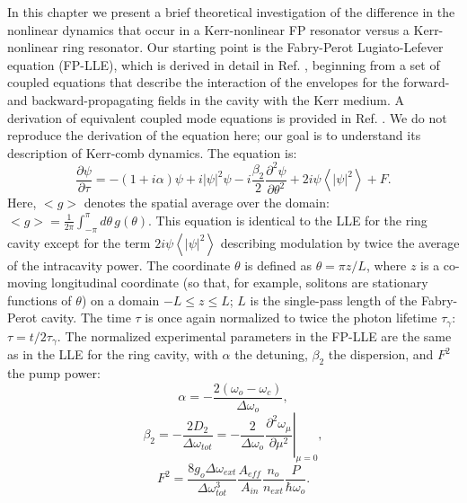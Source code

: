 In this chapter we present a brief theoretical investigation of the difference in the nonlinear dynamics that occur in a Kerr-nonlinear FP resonator versus a Kerr-nonlinear ring resonator. Our starting point is the Fabry-Perot Lugiato-Lefever equation (FP-LLE), which is derived in detail in Ref. , beginning from a set of coupled equations that describe the interaction of the envelopes for the forward- and backward-propagating fields in the cavity with the Kerr medium. A derivation of equivalent coupled mode equations is provided in Ref. . We do not reproduce the derivation of the equation here; our goal is to understand its description of Kerr-comb dynamics. The equation is:
\begin{equation}
\frac{\partial\psi}{\partial\tau}=-(1+i\alpha)\psi+i|\psi|^2\psi-i\frac{\beta_2}{2}\frac{\partial^2\psi}{\partial\theta^2}+2i\psi\left<|\psi|^2\right>+F\label{eq:FPLLE}.
\end{equation}
Here, $<g>$ denotes the spatial average over the domain: $<g>=\frac{1}{2\pi}\int_{-\pi}^{\pi}d\theta\,g(\theta)$. This equation is identical to the LLE for the ring cavity except for the term $2i\psi\left<|\psi|^2\right>$ describing modulation by twice the average of the intracavity power. The coordinate $\theta$ is defined as $\theta=\pi z/L$, where $z$ is a co-moving longitudinal coordinate (so that, for example, solitons are stationary functions of $\theta$) on a domain $-L\leq z\leq L$; $L$ is the single-pass length of the Fabry-Perot cavity. The time $\tau$ is once again normalized to twice the photon lifetime $\tau_\gamma$: $\tau=t/2\tau_\gamma$. The normalized experimental parameters in the FP-LLE are the same as in the LLE for the ring cavity, with $\alpha$ the detuning, $\beta_2$ the dispersion, and $F^2$ the pump power:
\begin{equation}
\alpha=-\frac{2(\omega_o-\omega_c)}{\Delta\omega_o},
\end{equation}
\begin{equation}
\beta_2=\left.-\frac{2D_2}{\Delta\omega_{tot}}=-\frac{2}{\Delta\omega_o}\frac{\partial^2\omega_\mu}{\partial \mu^2}\right|_{\mu=0}, \label{betaLLE}
\end{equation}
\begin{equation}
F^2=\frac{8g_o\Delta\omega_{ext}}{\Delta\omega_{tot}^3}\frac{A_{eff}}{A_{in}}\frac{n_o}{n_{ext}}\frac{P}{\hbar\omega_o}.
\end{equation}
